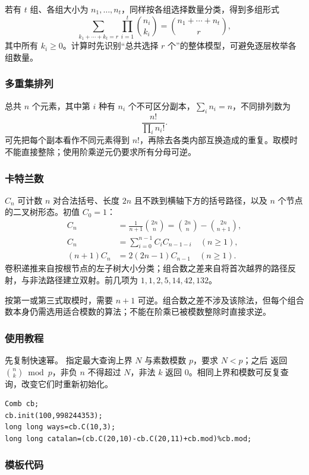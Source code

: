 若有 $t$ 组、各组大小为 $n_1,\ldots,n_t$，同样按各组选择数量分类，得到多组形式
\[
    \sum_{k_1+\cdots+k_t=r}\prod_{i=1}^t\binom{n_i}{k_i}
    =\binom{n_1+\cdots+n_t}r,
\]
其中所有 $k_i\geq0$。计算时先识别“总共选择 $r$ 个”的整体模型，可避免逐层枚举各组数量。

\subsubsection*{多重集排列}
总共 $n$ 个元素，其中第 $i$ 种有 $n_i$ 个不可区分副本，$\sum_i n_i=n$，不同排列数为
\[
    \frac{n!}{\prod_i n_i!}.
\]
可先把每个副本看作不同元素得到 $n!$，再除去各类内部互换造成的重复。取模时不能直接整除；使用阶乘逆元仍要求所有分母可逆。

\subsubsection*{卡特兰数}
$C_n$ 可计数 $n$ 对合法括号、长度 $2n$ 且不跌到横轴下方的括号路径，以及 $n$ 个节点的二叉树形态。初值 $C_0=1$：
\begin{align*}
    C_n&=\frac1{n+1}\binom{2n}n
        =\binom{2n}n-\binom{2n}{n+1},\\
    C_n&=\sum_{i=0}^{n-1}C_iC_{n-1-i}\quad(n\geq1),\\
    (n+1)C_n&=2(2n-1)C_{n-1}\quad(n\geq1).
\end{align*}
卷积递推来自按根节点的左子树大小分类；组合数之差来自将首次越界的路径反射，与非法路径建立双射。前几项为 $1,1,2,5,14,42,132$。

按第一或第三式取模时，需要 $n+1$ 可逆。组合数之差不涉及该除法，但每个组合数本身仍需选用适合模数的算法；不能在阶乘已被模数整除时直接求逆。

\subsubsection*{使用教程}
先复制快速幂。 指定最大查询上界 $N$ 与素数模数 $p$，要求 $N<p$；之后  返回 $\binom nk\bmod p$，非负 $n$ 不得超过 $N$，非法 $k$ 返回 0。相同上界和模数可反复查询，改变它们时重新初始化。
\begin{lstlisting}[style=mtycpp,numbers=none]
Comb cb;
cb.init(100,998244353);
long long ways=cb.C(10,3);
long long catalan=(cb.C(20,10)-cb.C(20,11)+cb.mod)%cb.mod;
\end{lstlisting}

\subsubsection*{模板代码}
